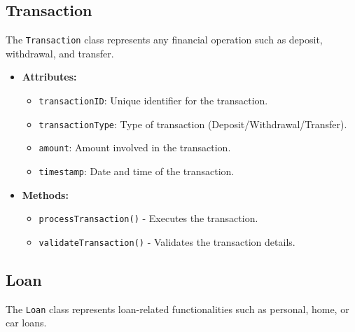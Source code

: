 \subsection{Transaction}\label{transaction}

The \texttt{Transaction} class represents any financial operation such
as deposit, withdrawal, and transfer.

\begin{itemize}
\item
  \textbf{Attributes:}

  \begin{itemize}
  \item
    \texttt{transactionID}: Unique identifier for the transaction.
  \item
    \texttt{transactionType}: Type of transaction
    (Deposit/Withdrawal/Transfer).
  \item
    \texttt{amount}: Amount involved in the transaction.
  \item
    \texttt{timestamp}: Date and time of the transaction.
  \end{itemize}
\item
  \textbf{Methods:}

  \begin{itemize}
  \item
    \texttt{processTransaction}\texttt{(}\texttt{)} - Executes the
    transaction.
  \item
    \texttt{validateTransaction}\texttt{(}\texttt{)} - Validates the
    transaction details.
  \end{itemize}
\end{itemize}

\subsection{Loan}\label{loan-1}

The \texttt{Loan} class represents loan-related functionalities such as
personal, home, or car loans.

